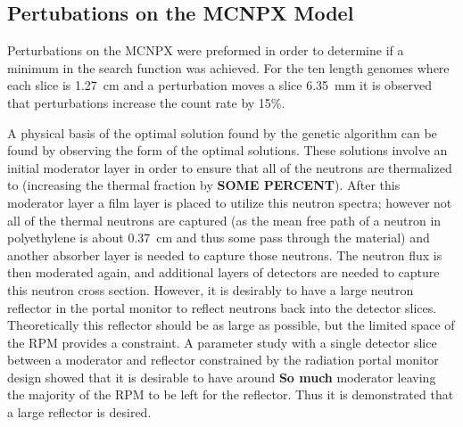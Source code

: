 \subsection{Pertubations on the MCNPX Model}
Perturbations on the MCNPX were preformed in order to determine if a minimum in the search function was achieved.
For the ten length genomes where each slice is \SI{1.27}{\cm} and a perturbation moves a slice \SI{6.35}{\mm} it is observed that perturbations increase the count rate by 15\%.




A physical basis of the optimal solution found by the genetic algorithm can be found by observing the form of the optimal solutions.
These solutions involve an initial moderator layer in order to ensure that all of the neutrons are thermalized to (increasing the thermal fraction by \textbf{SOME PERCENT}).
After this moderator layer a film layer is placed to utilize this neutron spectra; however not all of the thermal neutrons are captured (as the mean free path of a neutron in polyethylene is about \SI{0.37}{\cm} and thus some pass through the material) and another absorber layer is needed to capture those neutrons.  
The neutron flux is then moderated again, and additional layers of detectors are needed to capture this neutron cross section.
However, it is desirably to have a large neutron reflector in the portal monitor to reflect neutrons back into the detector slices. 
Theoretically this reflector should be as large as possible, but the limited space of the RPM provides a constraint.
A parameter study with a single detector slice between a moderator and reflector constrained by the radiation portal monitor design showed that it is desirable to have around \textbf{So much} moderator leaving the majority of the RPM to be left for the reflector.
Thus it is demonstrated that a large reflector is desired.